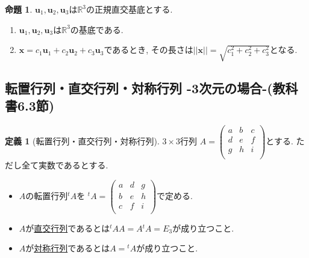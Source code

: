 \documentclass[dvipdfmx,a4paper,11pt]{article}
\newcommand{\R}{\mathbb{R}}
\theoremstyle{definition}
\newtheorem{prop}[thm]{命題}
\newtheorem{dfn}[thm]{定義}
\begin{document}
   \begin{tcolorbox}[
    colback = white,
    colframe = green!35!black,
    fonttitle = \bfseries,
    breakable = true]
    \begin{prop}
   $\bm{u}_1, \bm{u}_2, \bm{u}_3$は$\R^3$の正規直交基底とする.
  \begin{enumerate}
  \setlength{\parskip}{0cm}
 \setlength{\itemsep}{0pt} 
\item  $\bm{u}_1, \bm{u}_2, \bm{u}_3$は$\R^3$の基底である.
\item $\bm{x} = c_1\bm{u}_1 + c_2\bm{u}_2 + c_3\bm{u}_3$であるとき, その長さは$|| \bm{x} ||=\sqrt{c_{1}^{2} + c_{2}^{2} + c_{3}^2}$となる. 
  \end{enumerate}
  \end{prop}
 \end{tcolorbox}
 
 
 
 \subsection{転置行列・直交行列・対称行列 -3次元の場合-(教科書6.3節)}
 
 \begin{tcolorbox}[
    colback = white,
    colframe = green!35!black,
    fonttitle = \bfseries,
    breakable = true]
    \begin{dfn}[転置行列・直交行列・対称行列]
$3\times 3$行列
$
A=\begin{pmatrix}
a& b &c\\
d & e& f\\
g & h& i \\
\end{pmatrix}
$とする. ただし全て実数であるとする. 
\begin{itemize}
\setlength{\parskip}{0cm}
 \setlength{\itemsep}{0pt} 
\item $A$の転置行列${}^t A$を
${}^t A =\begin{pmatrix}
a& d &g\\
b& e& h\\
c & f& i \\
\end{pmatrix}
$で定める.
\item $A$が\underline{直交行列}であるとは${}^t A A= A {}^t A = E_3$が成り立つこと.
\item $A$が\underline{対称行列}であるとは$ A= {}^t A$が成り立つこと.
\end{itemize}
\end{dfn}
 \end{tcolorbox}
 
\end{document}
